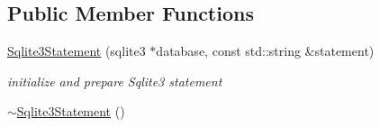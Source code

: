 \subsection*{Public Member Functions}
\begin{DoxyCompactItemize}
\item 
\hyperlink{classndn_1_1util_1_1Sqlite3Statement_a2e72a86092f7229422c942a7b6385c3a}{Sqlite3\+Statement} (sqlite3 $\ast$database, const std\+::string \&statement)
\begin{DoxyCompactList}\small\item\em initialize and prepare Sqlite3 statement \end{DoxyCompactList}\item 
\hyperlink{classndn_1_1util_1_1Sqlite3Statement_aaf80b395ae53cdc4079a8e57f2c985d8}{$\sim$\+Sqlite3\+Statement} ()\hypertarget{classndn_1_1util_1_1Sqlite3Statement_aaf80b395ae53cdc4079a8e57f2c985d8}{}\label{classndn_1_1util_1_1Sqlite3Statement_aaf80b395ae53cdc4079a8e57f2c985d8}


\end{DoxyCompactItemize}
